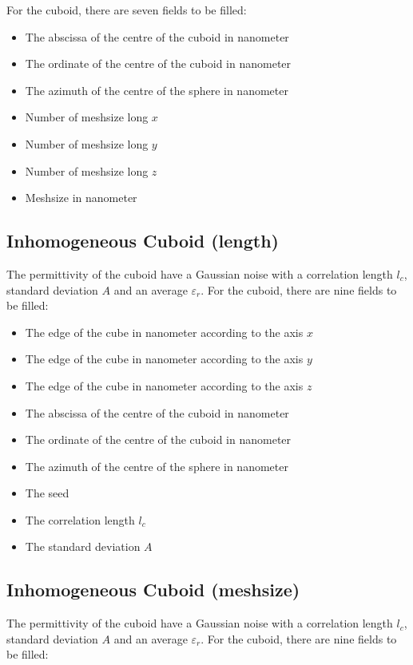For the cuboid, there are seven fields to be filled:

\begin{itemize}
\item The abscissa of the centre of the cuboid in nanometer
\item The ordinate of the centre of the cuboid in nanometer
\item The azimuth of the centre of the sphere in nanometer
\item Number of meshsize long $x$
\item Number of meshsize long $y$
\item Number of meshsize long $z$
\item Meshsize in nanometer
\end{itemize}


\subsection{Inhomogeneous Cuboid (length)}


The permittivity of the cuboid have a Gaussian noise with a
correlation length $l_c$, standard deviation $A$ and an average
$\varepsilon_r$.  For the cuboid, there are nine fields to be filled:

\begin{itemize}
\item The edge of the cube in nanometer according to the axis $x$
\item The edge of the cube in nanometer according to the axis $y$
\item The edge of the cube in nanometer according to the axis $z$
\item The abscissa of the centre of the cuboid in nanometer
\item The ordinate of the centre of the cuboid in nanometer
\item The azimuth of the centre of the sphere in nanometer
\item The seed
\item The correlation length $l_c$
\item The standard deviation $A$

\end{itemize}


\subsection{Inhomogeneous Cuboid (meshsize)}


The permittivity of the cuboid have a Gaussian noise with a
correlation length $l_c$, standard deviation $A$ and an average
$\varepsilon_r$.  For the cuboid, there are nine fields to be filled:

